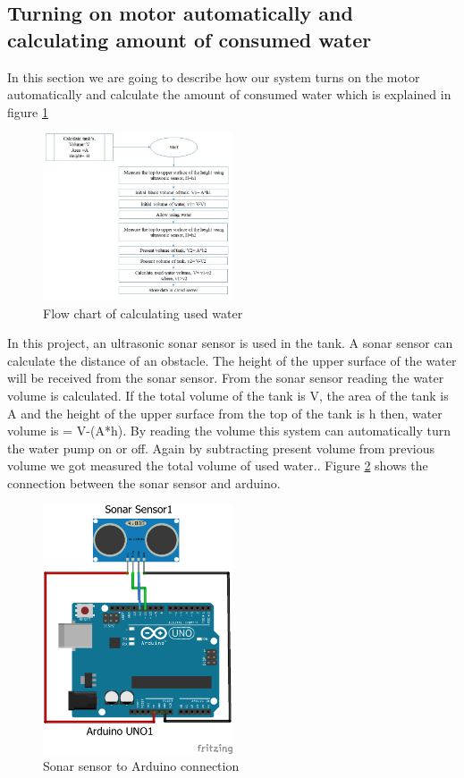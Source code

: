 \subsection{Turning on motor automatically and calculating amount of consumed water}
In this section we are going to describe how our system turns on the motor automatically and calculate the amount of consumed water which is explained in figure \ref{consumedWater}

\begin{figure}[H]
\centering
\includegraphics[width=0.5\textwidth]{figures/ConsumedWater.jpg}
\caption{Flow chart of calculating used water}
\label{consumedWater}
\end{figure}
In this project, an ultrasonic sonar sensor is used in the tank. A sonar sensor can calculate the distance of an obstacle. The height of the upper surface of the water will be received from the sonar sensor. From the sonar sensor reading the water volume is calculated. If the total volume of the tank is V, the area of the tank is A and the height of the upper surface from the top of the tank is h then, water volume is = V-(A*h). By reading the volume this system can automatically turn the water pump on or off. Again by subtracting present volume from previous volume we got measured the total volume of used water.. Figure \ref{sonar} shows the connection between the sonar sensor and arduino.
\begin{figure}[H]
\centering
\includegraphics[width=0.5\textwidth]{figures/sonar_bb.png}
\caption{Sonar sensor to Arduino connection}
\label{sonar}
\end{figure}
